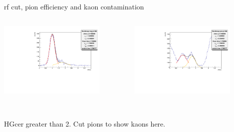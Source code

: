 \documentclass[aspectratio=169,xcolor=dvipsnames]{beamer}
\begin{document}
\begin{frame}{rf cut, pion efficiency and kaon contamination}
  \begin{columns}
    \begin{column}[T]{0.5\textwidth}
  \includegraphics[width = 0.8\textwidth]{results/pid/rftime/rftime_neg_280.pdf}
\end{column}
\begin{column}[T]{0.5\textwidth}
  \includegraphics[width = 0.8\textwidth]{results/pid/rftime/rftime_pos_280.pdf}
\end{column}
\end{columns}
\\
HGcer greater than 2. Cut pions to show kaons here. 
\end{frame}
\end{document}
